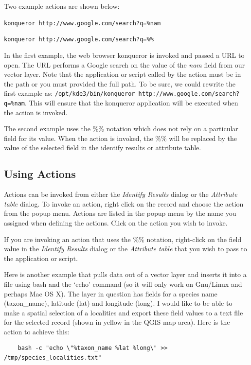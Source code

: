 Two example actions are shown below:
\begin{compactenum}
  \item \texttt{konqueror http://www.google.com/search?q=\%nam}
  \item \texttt{konqueror http://www.google.com/search?q=\%\%}
\end{compactenum}
In the first example, the web browser konqueror is invoked and passed a URL to
open. The URL performs a Google search on the value of the \textit{nam} field
from our vector layer. Note that the application or script called by the action
must be in the path or you must provided the full path. To be sure, we could
rewrite the first example as: \texttt{/opt/kde3/bin/konqueror
http://www.google.com/search?q=\%nam}. This will ensure that the konqueror
application will be executed when the action is invoked.

The second example uses the \%\% notation which does not rely on a particular
field for its value. When the action is invoked, the \%\% will be replaced by
the value of the selected field in the identify results or attribute table.

\subsection{Using Actions}
Actions can be invoked from either the \textit{Identify Results} dialog or the
\textit{Attribute table} dialog. To invoke an action, right click on the record
and choose the action from the popup menu. Actions are listed in the popup menu
by the name you assigned when defining the actions. Click on the action you wish
to invoke.

If you are invoking an action that uses the \%\% notation, right-click on the
field value in the \textit{Identify Results} dialog or the
\textit{Attribute table} that you wish to pass to the application or script.

Here is another example that pulls data out of a vector layer and inserts it
into a file using bash and the `echo' command (so it will only work on Gnu/Linux
and perhaps Mac OS X). The layer in question has fields for a species name
(taxon\_name), latitude (lat) and longitude (long). I would like to be able to
make a spatial selection of a localities and export these field values to a text
file for the selected record (shown in yellow in the QGIS map area). Here is the
action to achieve this:

\begin{verbatim}
	bash -c "echo \"%taxon_name %lat %long\" >> /tmp/species_localities.txt"
\end{verbatim} 

